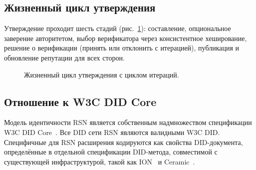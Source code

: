 \documentclass[11pt,a4paper,twocolumn]{article}
\begin{document}
\subsection{Жизненный цикл утверждения}

Утверждение проходит шесть стадий (рис.~\ref{fig:lifecycle}): составление, опциональное заверение авторитетом, выбор верификатора через консистентное хеширование, решение о верификации (принять или отклонить с итерацией), публикация и обновление репутации для всех сторон.

\begin{figure}[ht]
\centering
{}
\caption{Жизненный цикл утверждения с циклом итераций.}
\label{fig:lifecycle}
\end{figure}

\subsection{Отношение к W3C DID Core}

Модель идентичности RSN является собственным надмножеством спецификации W3C DID Core~\cite{did2022}. Все DID сети RSN являются валидными W3C DID. Специфичные для RSN расширения кодируются как свойства DID-документа, определённые в отдельной спецификации DID-метода, совместимой с существующей инфраструктурой, такой как ION~\cite{buchner2021} и Ceramic~\cite{ceramic2023}.

\end{document}
